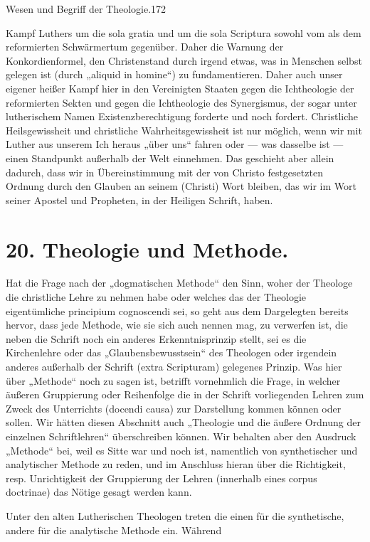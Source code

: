 {\noindent\normalsize Wesen und Begriff der Theologie.\hfill 172}

Kampf Luthers um die sola gratia und um die sola Scriptura sowohl vom als dem reformierten Schwärmertum gegenüber. Daher die Warnung der Konkordienformel, den Christenstand durch irgend etwas, was in Menschen selbst gelegen ist (durch „aliquid in homine“) zu fundamentieren. Daher auch unser eigener heißer Kampf hier in den Vereinigten Staaten gegen die Ichtheologie der reformierten Sekten und gegen die Ichtheologie des Synergismus, der sogar unter lutherischem Namen Existenzberechtigung forderte und noch fordert. Christliche Heilsgewissheit und christliche Wahrheitsgewissheit ist nur möglich, wenn wir mit Luther aus unserem Ich heraus „über uns“ fahren oder --- was dasselbe ist --- einen Standpunkt außerhalb der Welt einnehmen. Das geschieht aber allein dadurch, dass wir in Übereinstimmung mit der von Christo festgesetzten Ordnung durch den Glauben an seinem (Christi) Wort bleiben, das wir im Wort seiner Apostel und Propheten, in der Heiligen Schrift, haben.

\section*{20. Theologie und Methode.}

Hat die Frage nach der „dogmatischen Methode“ den Sinn, woher der Theologe die christliche Lehre zu nehmen habe oder welches das der Theologie eigentümliche principium cognoscendi sei, so geht aus dem Dargelegten bereits hervor, dass jede Methode, wie sie sich auch nennen mag, zu verwerfen ist, die neben die Schrift noch ein anderes Erkenntnisprinzip stellt, sei es die Kirchenlehre oder das „Glaubensbewusstsein“ des Theologen oder irgendein anderes außerhalb der Schrift (extra Scripturam) gelegenes Prinzip. Was hier über „Methode“ noch zu sagen ist, betrifft vornehmlich die Frage, in welcher äußeren Gruppierung oder Reihenfolge die in der Schrift vorliegenden Lehren zum Zweck des Unterrichts (docendi causa) zur Darstellung kommen können oder sollen. Wir hätten diesen Abschnitt auch „Theologie und die äußere Ordnung der einzelnen Schriftlehren“ überschreiben können. Wir behalten aber den Ausdruck „Methode“ bei, weil es Sitte war und noch ist, namentlich von synthetischer und analytischer Methode zu reden, und im Anschluss hieran über die Richtigkeit, resp. Unrichtigkeit der Gruppierung der Lehren (innerhalb eines corpus doctrinae) das Nötige gesagt werden kann.

Unter den alten Lutherischen Theologen treten die einen für die synthetische, andere für die analytische Methode ein. Während